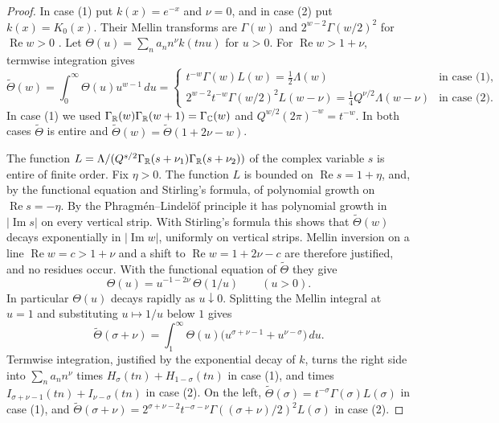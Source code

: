 \begin{proof}
In case (1) put $k(x)=e^{-x}$ and $\nu=0$, and in case (2) put
$k(x)=K_0(x)$. Their Mellin transforms are $\Gamma(w)$ and
$2^{w-2}\Gamma(w/2)^2$ for $\operatorname{Re}w>0$
\cite[10.43.19]{DLMF}. Let $\Theta(u)=\sum_na_nn^\nu k(tnu)$ for $u>0$. For
$\operatorname{Re}w>1+\nu$, termwise integration gives
\[
 \widetilde\Theta(w)=\int_0^\infty\Theta(u)u^{w-1}\,du=
 \begin{cases}
 t^{-w}\Gamma(w)L(w)=\tfrac12\Lambda(w)&\text{in case (1)},\\
 2^{w-2}t^{-w}\Gamma(w/2)^2L(w-\nu)=\tfrac14Q^{\nu/2}\Lambda(w-\nu)
 &\text{in case (2)}.
 \end{cases}
\]
In case (1) we used $\Gamma_\mathbb R(w)\Gamma_\mathbb R(w+1)=\Gamma_\mathbb C(w)$ and
$Q^{w/2}(2\pi)^{-w}=t^{-w}$. In both cases $\widetilde\Theta$ is entire and
$\widetilde\Theta(w)=\widetilde\Theta(1+2\nu-w)$.

The function $L=\Lambda/(Q^{s/2}\Gamma_\mathbb R(s+\nu_1)\Gamma_\mathbb R(s+\nu_2))$ of the
complex variable $s$ is entire of finite order. Fix $\eta>0$. The function
$L$ is bounded on $\operatorname{Re}s=1+\eta$, and, by the functional
equation and Stirling's formula, of polynomial growth on
$\operatorname{Re}s=-\eta$. By the Phragm\'en--Lindel\"of principle it has
polynomial growth in $|\operatorname{Im}s|$ on every vertical strip. With
Stirling's formula this shows that $\widetilde\Theta(w)$ decays exponentially in
$|\operatorname{Im}w|$, uniformly on vertical strips. Mellin inversion on a
line $\operatorname{Re}w=c>1+\nu$ and a shift to
$\operatorname{Re}w=1+2\nu-c$ are therefore justified, and no residues
occur. With the functional equation of $\widetilde\Theta$ they give
\[
 \Theta(u)=u^{-1-2\nu}\,\Theta(1/u)\qquad(u>0).
\]
In particular $\Theta(u)$ decays rapidly as $u\downarrow0$. Splitting the
Mellin integral at $u=1$ and substituting $u\mapsto1/u$ below $1$ gives
\[
 \widetilde\Theta(\sigma+\nu)=\int_1^\infty\Theta(u)
 \bigl(u^{\sigma+\nu-1}+u^{\nu-\sigma}\bigr)\,du.
\]
Termwise integration, justified by the exponential decay of $k$, turns the
right side into $\sum_na_nn^\nu$ times $H_\sigma(tn)+H_{1-\sigma}(tn)$ in case
(1), and times $I_{\sigma+\nu-1}(tn)+I_{\nu-\sigma}(tn)$ in case (2). On the
left, $\widetilde\Theta(\sigma)=t^{-\sigma}\Gamma(\sigma)L(\sigma)$ in case (1), and
$\widetilde\Theta(\sigma+\nu)=2^{\sigma+\nu-2}t^{-\sigma-\nu}
\Gamma((\sigma+\nu)/2)^2L(\sigma)$ in case (2).
\end{proof}

